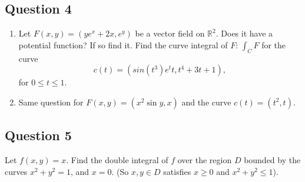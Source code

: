 \documentclass{amsart}
\numberwithin {equation} {section}
\begin{document}
\subsection*{Question 4}
\label{sub:question_4}
\begin{enumerate}
   \item    
Let $F (x,y) = (y e ^{x} + 2x, e ^{y}) $ be a vector field on $\mathbb{R} ^{2}
$. Does it have a potential function? If so find it. Find the curve integral of
$F$:  $\int _{C} F $ for the curve $$c (t) = (sin (t ^{3} )e ^{t}t, t ^{4}+3t +1
),$$ for $0 \leq t
\leq 1$. 
 \item Same question for $F (x,y) = (x ^{2}\sin y, x )$ and the curve $c (t) =
    (t ^{2},t )$.
\end{enumerate}
\newpage


\subsection*{Question 5}
\label{sub:question_5}
Let $f (x,y) = x $. Find the double integral of $f$ over the region $D$
bounded by the curves $x ^{2} + y ^{2} =1  $, and $x=0$. (So $x,y \in D$
satisfies $x \geq 0$ and $x ^{2} + y ^{2} \leq 1  $).
\end{document}
